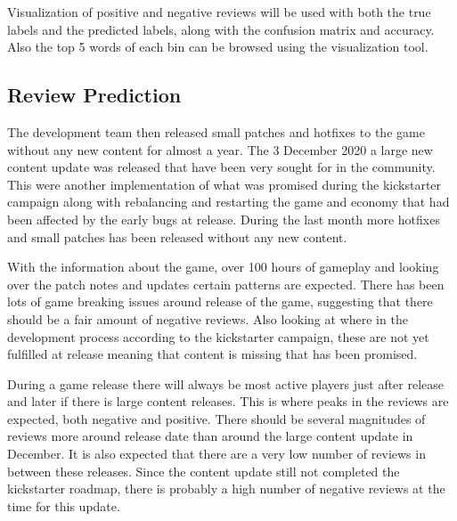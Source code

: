 Visualization of positive and negative reviews will be used with both the true labels and the predicted labels, along with the confusion matrix and accuracy.
Also the top 5 words of each bin can be browsed using the visualization tool.


\subsection{Review Prediction}
\label{sec:review-prediction}


The development team then released small patches and hotfixes to the game without any new content for almost a year. 
The 3 December 2020 a large new content update was released that have been very sought for in the community. 
This were another implementation of what was promised during the kickstarter campaign along with rebalancing and restarting the game and economy that had been affected by the early bugs at release. 
During the last month more hotfixes and small patches has been released without any new content.


With the information about the game, over 100 hours of gameplay and looking over the patch notes and updates certain patterns are expected. 
There has been lots of game breaking issues around release of the game, suggesting that there should be a fair amount of negative reviews. 
Also looking at where in the development process according to the kickstarter campaign, these are not yet fulfilled at release meaning that content is missing that has been promised. 


During a game release there will always be most active players just after release and later if there is large content releases. 
This is where peaks in the reviews are expected, both negative and positive. 
There should be several magnitudes of reviews more around release date than around the large content update in December. 
It is also expected that there are a very low number of reviews in between these releases. 
Since the content update still not completed the kickstarter roadmap, there is probably a high number of negative reviews at the time for this update.